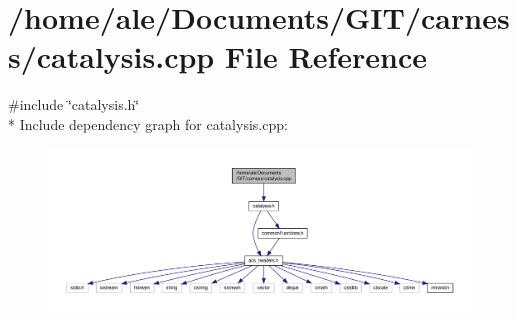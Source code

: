 \hypertarget{a00067}{\section{/home/ale/\-Documents/\-G\-I\-T/carness/catalysis.cpp File Reference}
\label{a00067}
}
{\ttfamily \#include \char`\"{}catalysis.\-h\char`\"{}}\\*
Include dependency graph for catalysis.\-cpp\-:\nopagebreak
\begin{figure}[H]
\begin{center}
\leavevmode
\includegraphics[width=350pt]{a00120}
\end{center}
\end{figure}
